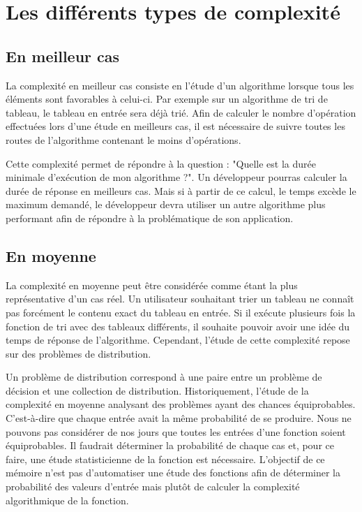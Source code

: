 \documentclass[12pt, twoside, openright]{report}
\begin{document}
\section{Les différents types de complexité}

\subsection{En meilleur cas}

La complexité en meilleur cas consiste en l'étude d'un algorithme lorsque tous les éléments sont favorables à celui-ci. Par exemple sur un algorithme de tri de tableau, le tableau en entrée sera déjà trié. Afin de calculer le nombre d'opération effectuées lors d'une étude en meilleurs cas, il est nécessaire de suivre toutes les routes de l'algorithme contenant le moins d'opérations. 

Cette complexité permet de répondre à la question : "Quelle est la durée minimale d'exécution de mon algorithme ?". Un développeur pourras calculer la durée de réponse en meilleurs cas. Mais si à partir de ce calcul, le temps excède le maximum demandé, le développeur devra utiliser un autre algorithme plus performant afin de répondre à la problématique de son application. 

\subsection{En moyenne}


La complexité en moyenne peut être considérée comme étant la plus représentative d'un cas réel. Un utilisateur souhaitant trier un tableau ne connaît pas forcément le contenu exact du tableau en entrée. Si il exécute plusieurs fois la fonction de tri avec des tableaux différents, il souhaite pouvoir avoir une idée du temps de réponse de l'algorithme. Cependant, l'étude de cette complexité repose sur des problèmes de distribution.

Un problème de distribution correspond à une paire entre un problème de décision et une collection de distribution. Historiquement, l'étude de la complexité en moyenne analysant des problèmes ayant des chances équiprobables.\cite{avgComplexity02} C'est-à-dire que chaque entrée avait la même probabilité de se produire. Nous ne pouvons pas considérer de nos jours que toutes les entrées d'une fonction soient équiprobables. Il faudrait déterminer la probabilité de chaque cas et, pour ce faire, une étude statisticienne de la fonction est nécessaire. L'objectif de ce mémoire n'est pas d'automatiser une étude des fonctions afin de déterminer la probabilité des valeurs d'entrée mais plutôt de calculer la complexité algorithmique de la fonction.
\end{document}
